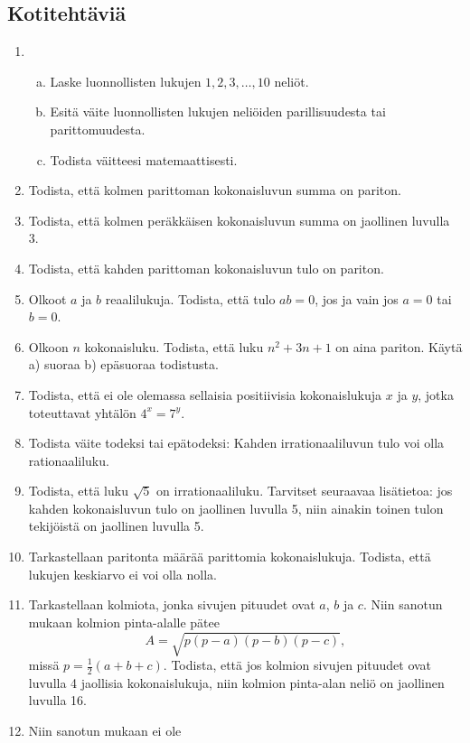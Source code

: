 \subsection*{Kotitehtäviä}

\begin{enumerate}
	\item \begin{enumerate}[a)]
		\item Laske luonnollisten lukujen $1, 2, 3,\ldots, 10$ neliöt.
		\item Esitä väite luonnollisten lukujen neliöiden parillisuudesta tai parittomuudesta.
		\item Todista väitteesi matemaattisesti.
		\end{enumerate}
	\item Todista, että kolmen parittoman kokonaisluvun summa on pariton.
	\item Todista, että kolmen peräkkäisen kokonaisluvun summa on jaollinen luvulla 3.
	\item Todista, että kahden parittoman kokonaisluvun tulo on pariton.
	\item Olkoot $a$ ja $b$ reaalilukuja. Todista, että tulo $ab = 0$, jos ja vain jos $a=0$ tai $b=0$.
	\item Olkoon $n$ kokonaisluku. Todista, että luku $n^{2} + 3n + 1$ on aina pariton. Käytä a) suoraa b) epäsuoraa
		todistusta.
	\item Todista, että ei ole olemassa sellaisia positiivisia kokonaislukuja $x$ ja $y$, jotka toteuttavat
		yhtälön $4^{x} = 7^{y}$.
	\item Todista väite todeksi tai epätodeksi: Kahden
		irrationaaliluvun tulo voi olla rationaaliluku.
	\item Todista, että luku $\sqrt{5}$ on irrationaaliluku.
		Tarvitset seuraavaa lisätietoa: jos kahden kokonaisluvun
		tulo on jaollinen luvulla 5, niin ainakin toinen tulon
		tekijöistä on jaollinen luvulla 5.
	\item Tarkastellaan paritonta määrää parittomia kokonaislukuja.
		Todista, että lukujen keskiarvo ei voi olla nolla.
	\item Tarkastellaan kolmiota, jonka sivujen pituudet ovat
		$a$, $b$ ja $c$. Niin sanotun  mukaan
		kolmion pinta-alalle pätee \[A = \sqrt{p(p-a)(p-b)(p-c)},\]
		missä $p = \frac{1}{2}(a+b+c)$. Todista, että jos kolmion
		sivujen pituudet ovat luvulla 4 jaollisia kokonaislukuja,
		niin kolmion pinta-alan neliö on jaollinen luvulla 16.
	\item Niin sanotun  mukaan ei ole

\end{enumerate}

